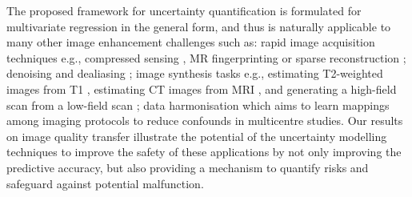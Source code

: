 
The proposed framework for uncertainty quantification is formulated for multivariate regression in the general form, and thus is naturally applicable to many other image enhancement challenges such as: rapid image acquisition techniques e.g., compressed sensing \cite{sun2016deep}, MR fingerprinting \cite{ma2013magnetic,cohen2018mr} or sparse reconstruction \cite{schlemper2018deep,hammernik2018learning}; denoising \cite{benou2017ensemble} and dealiasing \cite{yang2018dagan,han2018deep}; image synthesis tasks e.g., estimating T2-weighted images from T1 \cite{rousseau2008brain,ye2013modality,jog2015mr}, estimating CT images from MRI \cite{burgos2015robust,bragman2018uncertainty,nie2018medical}, and generating a high-field scan from a low-field scan \cite{bahrami2016convolutional}; data harmonisation
\cite{mirzaalian2016inter,karayumak2018harmonizing,tax2019cross} which aims to learn mappings among imaging protocols to reduce confounds in multicentre studies. Our results on image quality transfer \cite{alexander2017image} illustrate the potential of the uncertainty modelling techniques to improve the safety of these applications by not only improving the predictive accuracy, but also providing a mechanism to quantify risks and safeguard against potential malfunction. 



%


 
% 
% 

